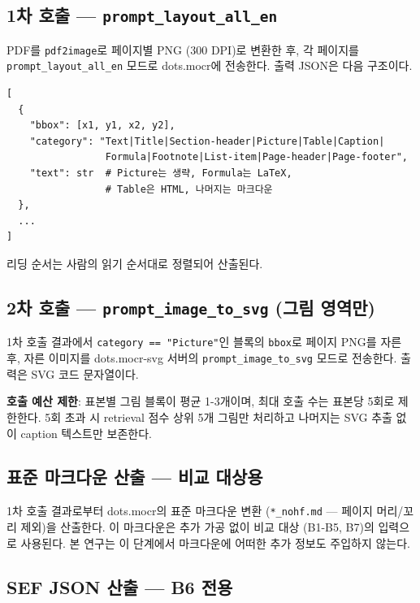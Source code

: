 \documentclass[11pt]{article}
\begin{document}
\subsection{1차 호출 — \texttt{prompt\_layout\_all\_en}}

PDF를 \texttt{pdf2image}로 페이지별 PNG (300 DPI)로 변환한 후, 각 페이지를 \texttt{prompt\_layout\_all\_en} 모드로 dots.mocr에 전송한다. 출력 JSON은 다음 구조이다.

\begin{tcolorbox}[colback=gray!5,colframe=gray!50,title=dots.mocr 페이지 출력 (1차 호출)]
\small
\begin{verbatim}
[
  {
    "bbox": [x1, y1, x2, y2],
    "category": "Text|Title|Section-header|Picture|Table|Caption|
                 Formula|Footnote|List-item|Page-header|Page-footer",
    "text": str  # Picture는 생략, Formula는 LaTeX,
                 # Table은 HTML, 나머지는 마크다운
  },
  ...
]
\end{verbatim}
\end{tcolorbox}

리딩 순서는 사람의 읽기 순서대로 정렬되어 산출된다.

\subsection{2차 호출 — \texttt{prompt\_image\_to\_svg} (그림 영역만)}

1차 호출 결과에서 \texttt{category == "Picture"}인 블록의 \texttt{bbox}로 페이지 PNG를 자른 후, 자른 이미지를 dots.mocr-svg 서버의 \texttt{prompt\_image\_to\_svg} 모드로 전송한다. 출력은 SVG 코드 문자열이다.

\textbf{호출 예산 제한}: 표본별 그림 블록이 평균 1-3개이며, 최대 호출 수는 표본당 5회로 제한한다. 5회 초과 시 retrieval 점수 상위 5개 그림만 처리하고 나머지는 SVG 추출 없이 caption 텍스트만 보존한다.

\subsection{표준 마크다운 산출 — 비교 대상용}

1차 호출 결과로부터 dots.mocr의 표준 마크다운 변환 (\texttt{*\_nohf.md} — 페이지 머리/꼬리 제외)을 산출한다. 이 마크다운은 추가 가공 없이 비교 대상 (B1-B5, B7)의 입력으로 사용된다. 본 연구는 이 단계에서 마크다운에 어떠한 추가 정보도 주입하지 않는다.

\subsection{SEF JSON 산출 — B6 전용}
\label{sec:sef-build}
\end{document}
